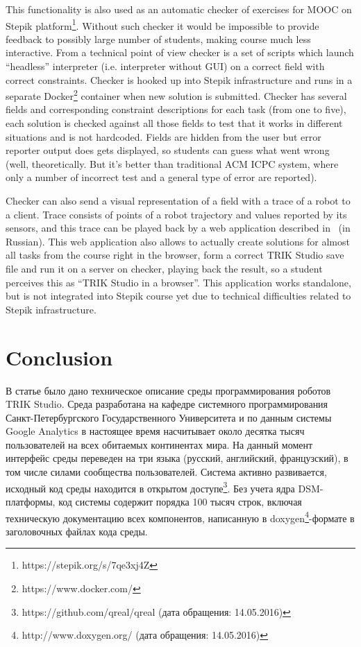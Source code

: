 \documentclass[conference]{IEEEtran}
\begin{document}
This functionality is also used as an automatic checker of exercises for MOOC on Stepik platform\footnote{https://stepik.org/s/7qe3xj4Z}. Without such checker it would be impossible to provide feedback to possibly large number of students, making course much less interactive. From a technical point of view checker is a set of scripts which launch "`headless"' interpreter (i.e. interpreter without GUI) on a correct field with correct constraints. Checker is hooked up into Stepik infrastructure and runs in a separate Docker\footnote{https://www.docker.com/} container when new solution is submitted. Checker has several fields and corresponding constraint descriptions for each task (from one to five), each solution is checked against all those fields to test that it works in different situations and is not hardcoded. Fields are hidden from the user but error reporter output does gets displayed, so students can guess what went wrong (well, theoretically. But it's better than traditional ACM ICPC system, where only a number of incorrect test and a general type of error are reported).

Checker can also send a visual representation of a field with a trace of a robot to a client. Trace consists of points of a robot trajectory and values reported by its sensors, and this trace can be played back by a web application described in~\cite{zakharov2016web} (in Russian). This web application also allows to actually create solutions for almost all tasks from the course right in the browser, form a correct TRIK Studio save file and run it on a server on checker, playing back the result, so a student perceives this as "`TRIK Studio in a browser"'. This application works standalone, but is not integrated into Stepik course yet due to technical difficulties related to Stepik infrastructure.

\section*{Conclusion}
\label{chapter:conclusion}

В статье было дано техническое описание среды программирования роботов TRIK Studio. Среда разработана на кафедре системного программирования Санкт-Петербургского Государственного Университета и по данным системы Google Analytics в настоящее время насчитывает около десятка тысяч пользователей на всех обитаемых континентах мира. На данный момент интерфейс среды переведен на три языка (русский, английский, французский), в том числе силами сообщества пользователей. Система активно развивается, исходный код среды находится в открытом доступе\footnote{https://github.com/qreal/qreal (дата обращения: 14.05.2016)}. Без учета ядра DSM-платформы, код системы содержит порядка 100 тысяч строк, включая техническую документацию всех компонентов, написанную в doxygen\footnote{http://www.doxygen.org/ (дата обращения: 14.05.2016)}-формате в заголовочных файлах кода среды.
\end{document}
